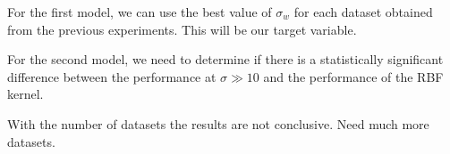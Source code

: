 For the first model,
we can use the best value of $\sigma_w$ for each dataset
obtained from the previous experiments. This will be our target
variable.

For the second model, we need to determine if there is a statistically
significant difference between the performance at $\sigma \gg 10$ and the
performance of the RBF kernel.


\begin{note}
    With the number of datasets the results are not conclusive.
    Need much more datasets.
\end{note}
